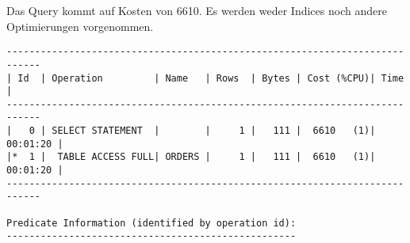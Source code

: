 \documentclass[11pt,a4paper,parskip=half]{scrartcl}
\begin{document}
Das Query kommt auf Kosten von 6610. Es werden weder Indices noch andere Optimierungen vorgenommen.
\begin{lstlisting}
----------------------------------------------------------------------------                                                                                                                                                                                                                                 
| Id  | Operation         | Name   | Rows  | Bytes | Cost (%CPU)| Time     |                                                                                                                                                                                                                                 
----------------------------------------------------------------------------                                                                                                                                                                                                                                 
|   0 | SELECT STATEMENT  |        |     1 |   111 |  6610   (1)| 00:01:20 |                                                                                                                                                                                                                                 
|*  1 |  TABLE ACCESS FULL| ORDERS |     1 |   111 |  6610   (1)| 00:01:20 |                                                                                                                                                                                                                                 
----------------------------------------------------------------------------                                                                                                                                                                                                                                 
                                                                                                                                                                                                                                                                                                             
Predicate Information (identified by operation id):                                                                                                                                                                                                                                                          
---------------------------------------------------                                                                                                                                                                                                                                                          
                                                                                                                                                                                                                                                                                                             

\end{lstlisting}
\end{document}
